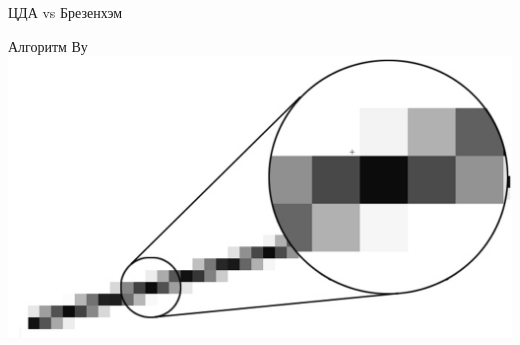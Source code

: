 \documentclass[10pt]{beamer}
\begin{document}
	\begin{frame}{ЦДА vs Брезенхэм}
		\centering
		
	\end{frame}
	
	\begin{frame}{Алгоритм Ву}
		\includegraphics[width=\textwidth]{Screenshot 2024-05-04 011143.png}
	\end{frame}

\end{document}
